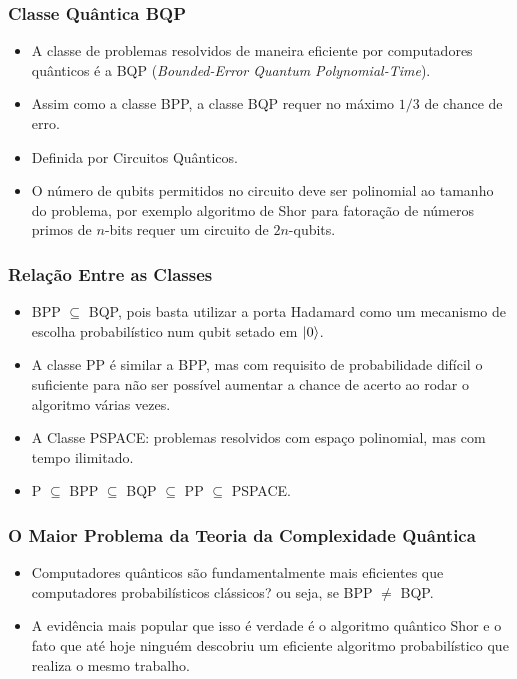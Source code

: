 \documentclass{beamer}
\DeclarePairedDelimiter\ket{\lvert}{\rangle}
\begin{document}
\begin{frame}
\frametitle{Classe Quântica BQP} 
\begin{itemize}
  \item A classe de problemas resolvidos de maneira eficiente por
  computadores quânticos é a BQP (\textit{Bounded-Error Quantum
    Polynomial-Time}).
  \item Assim como a classe BPP, a classe BQP requer no máximo $1/3$ de
  chance de erro.
  \item Definida por Circuitos Quânticos.
  \item O número de qubits permitidos no circuito deve ser polinomial
    ao tamanho do problema, por exemplo algoritmo de Shor para
    fatoração de números primos de $n$-bits requer um circuito de
    $2n$-qubits.
\end{itemize}
\end{frame}


\begin{frame}
\frametitle{Relação Entre as Classes} 
\begin{itemize}
  \item BPP $\subseteq$ BQP, pois basta utilizar a porta Hadamard como
  um mecanismo de escolha probabilístico num qubit setado em
  $\ket{0}$.
  \item A classe PP é similar a BPP, mas com requisito de probabilidade
  difícil o suficiente para não ser possível aumentar a chance de
  acerto ao rodar o algoritmo várias vezes.
  \item A Classe PSPACE: problemas resolvidos com espaço polinomial,
  mas com tempo ilimitado.
  \item P $\subseteq$ BPP $\subseteq$ BQP $\subseteq$ PP $\subseteq$ PSPACE.
\end{itemize}
\end{frame}

\begin{frame}
\frametitle{O Maior Problema da Teoria da Complexidade Quântica} 
\begin{itemize}
  \item Computadores quânticos são fundamentalmente mais eficientes que
computadores probabilísticos clássicos? ou seja, se BPP $\not =$ BQP.
  \item A evidência mais popular que isso é verdade é o algoritmo
  quântico Shor e o fato que até hoje ninguém descobriu um eficiente
  algoritmo probabilístico que realiza o mesmo trabalho.
\end{itemize}
\end{frame}
\end{document}

